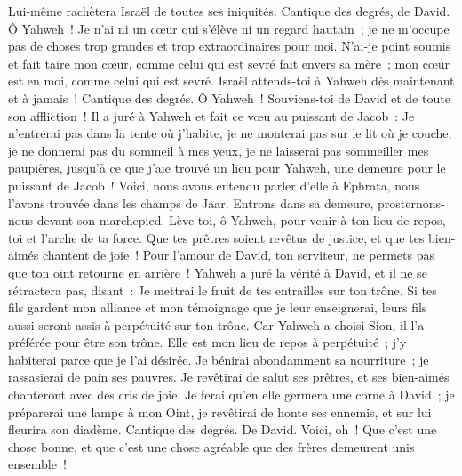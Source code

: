 \begin{multicols}{2}
Lui-même rachètera Israël de toutes ses iniquités.
\VerseOne{}Cantique des degrés, de David. Ô Yahweh~! Je n'ai ni un cœur qui s'élève ni un regard hautain~; je ne m'occupe pas de choses trop grandes et trop extraordinaires pour moi.
N'ai-je point soumis et fait taire mon cœur, comme celui qui est sevré fait envers sa mère~; mon cœur est en moi, comme celui qui est sevré.
Israël attends-toi à Yahweh dès maintenant et à jamais~!
\VerseOne{}Cantique des degrés. Ô Yahweh~! Souviens-toi de David et de toute son affliction~!
Il a juré à Yahweh et fait ce vœu au puissant de Jacob~:
Je n'entrerai pas dans la tente où j'habite, je ne monterai pas sur le lit où je couche,
je ne donnerai pas du sommeil à mes yeux, je ne laisserai pas sommeiller mes paupières,
jusqu'à ce que j'aie trouvé un lieu pour Yahweh, une demeure pour le puissant de Jacob~!
Voici, nous avons entendu parler d'elle à Ephrata, nous l'avons trouvée dans les champs de Jaar.
Entrons dans sa demeure, prosternons-nous devant son marchepied.
Lève-toi, ô Yahweh, pour venir à ton lieu de repos, toi et l'arche de ta force.
Que tes prêtres soient revêtus de justice, et que tes bien-aimés chantent de joie~!
Pour l'amour de David, ton serviteur, ne permets pas que ton oint retourne en arrière~!
Yahweh a juré la vérité à David, et il ne se rétractera pas, disant~: Je mettrai le fruit de tes entrailles sur ton trône.
Si tes fils gardent mon alliance et mon témoignage que je leur enseignerai, leurs fils aussi seront assis à perpétuité sur ton trône.
Car Yahweh a choisi Sion, il l'a préférée pour être son trône.
Elle est mon lieu de repos à perpétuité~; j'y habiterai parce que je l'ai désirée.
Je bénirai abondamment sa nourriture~; je rassasierai de pain ses pauvres.
Je revêtirai de salut ses prêtres, et ses bien-aimés chanteront avec des cris de joie.
Je ferai qu'en elle germera une corne à David~; je préparerai une lampe à mon Oint,
je revêtirai de honte ses ennemis, et sur lui fleurira son diadème.
\VerseOne{}Cantique des degrés. De David. Voici, oh~! Que c'est une chose bonne, et que c'est une chose agréable que des frères demeurent unis ensemble~!

\end{multicols}
